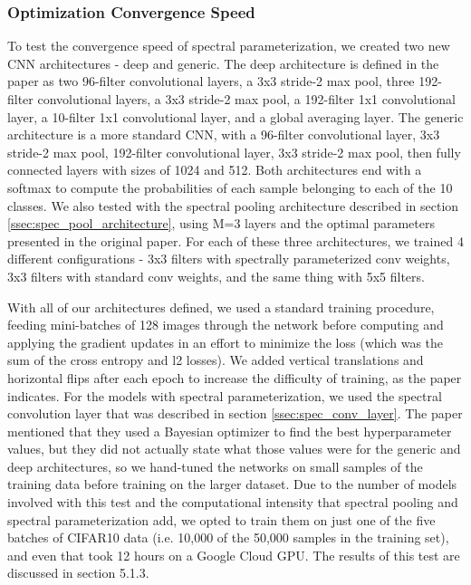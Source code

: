 \documentclass[10pt,journal,compsoc]{IEEEtran}
\begin{document}
\subsubsection{Optimization Convergence Speed}

To test the convergence speed of spectral parameterization, we created two new CNN architectures - deep and generic. The deep architecture is defined in the paper as two 96-filter convolutional layers, a 3x3 stride-2 max pool, three 192-filter convolutional layers, a 3x3 stride-2 max pool, a 192-filter 1x1 convolutional layer, a 10-filter 1x1 convolutional layer, and a global averaging layer. The generic architecture is a more standard CNN, with a 96-filter convolutional layer, 3x3 stride-2 max pool, 192-filter convolutional layer, 3x3 stride-2 max pool, then fully connected layers with sizes of 1024 and 512. Both architectures end with a softmax to compute the probabilities of each sample belonging to each of the 10 classes. We also tested with the spectral pooling architecture described in section \ref{ssec:spec_pool_architecture}, using M=3 layers and the optimal parameters presented in the original paper. For each of these three architectures, we trained 4 different configurations - 3x3 filters with spectrally parameterized conv weights, 3x3 filters with standard conv weights, and the same thing with 5x5 filters.

With all of our architectures defined, we used a standard training procedure, feeding mini-batches of 128 images through the network before computing and applying the gradient updates in an effort to minimize the loss (which was the sum of the cross entropy and l2 losses). We added vertical translations and horizontal flips after each epoch to increase the difficulty of training, as the paper indicates. For the models with spectral parameterization, we used the spectral convolution layer that was described in section \ref{ssec:spec_conv_layer}. The paper mentioned that they used a Bayesian optimizer to find the best hyperparameter values, but they did not actually state what those values were for the generic and deep architectures, so we hand-tuned the networks on small samples of the training data before training on the larger dataset. Due to the number of models involved with this test and the computational intensity that spectral pooling and spectral parameterization add, we opted to train them on just one of the five batches of CIFAR10 data (i.e. 10,000 of the 50,000 samples in the training set), and even that took 12 hours on a Google Cloud GPU. The results of this test are discussed in section 5.1.3.
\end{document}
